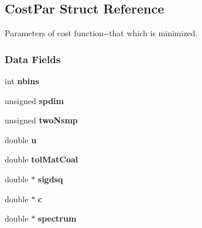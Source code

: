 \hypertarget{struct_cost_par}{\subsection{\-Cost\-Par \-Struct \-Reference}
\label{struct_cost_par}
}


\-Parameters of cost function-\/-\/that which is minimized.  


\subsubsection*{\-Data \-Fields}
\begin{DoxyCompactItemize}
\item 
\hypertarget{struct_cost_par_add5e631d434542a5173e30adcdede123}{int {\bfseries nbins}}\label{struct_cost_par_add5e631d434542a5173e30adcdede123}

\item 
\hypertarget{struct_cost_par_a0dc17eef03fc8c47dfa55b5c90b0f912}{unsigned {\bfseries spdim}}\label{struct_cost_par_a0dc17eef03fc8c47dfa55b5c90b0f912}

\item 
\hypertarget{struct_cost_par_ab0691b6d0b8f1744f841873be6f07689}{unsigned {\bfseries two\-Nsmp}}\label{struct_cost_par_ab0691b6d0b8f1744f841873be6f07689}

\item 
\hypertarget{struct_cost_par_a04723f4d0a1e478c0025637820342aae}{double {\bfseries u}}\label{struct_cost_par_a04723f4d0a1e478c0025637820342aae}

\item 
\hypertarget{struct_cost_par_a63053d5d3d0a6d32d8e0cd141f48c168}{double {\bfseries tol\-Mat\-Coal}}\label{struct_cost_par_a63053d5d3d0a6d32d8e0cd141f48c168}

\item 
\hypertarget{struct_cost_par_a602b33f175bb882f5099e61775821a49}{double $\ast$ {\bfseries sigdsq}}\label{struct_cost_par_a602b33f175bb882f5099e61775821a49}

\item 
\hypertarget{struct_cost_par_ae9baf57b32f714ebbd39510ab9309d48}{double $\ast$ {\bfseries c}}\label{struct_cost_par_ae9baf57b32f714ebbd39510ab9309d48}

\item 
\hypertarget{struct_cost_par_aab5740b037a3ca54e92118863b6a6f09}{double $\ast$ {\bfseries spectrum}}\label{struct_cost_par_aab5740b037a3ca54e92118863b6a6f09}


\end{DoxyCompactItemize}

